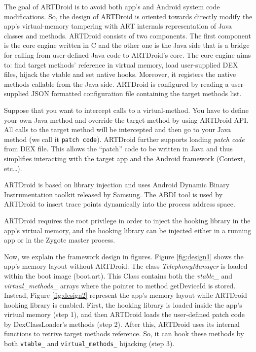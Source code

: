 The goal of ARTDroid is to avoid both app's and Android system code modifications. So, the design of ARTDroid is oriented towards directly modify the app's virtual-memory tampering with ART internals representation of Java classes and methods.
ARTDroid consists of two components. The first component is the core engine written in C and the other one is the Java side that is a bridge for calling from user-defined Java code to ARTDroid's core. The core engine aims to: find target methods' reference in virtual memory, load user-supplied DEX files, hijack the vtable and set native hooks. Moreover, it registers the native methods callable from the Java side. ARTDroid is configured by reading a user-supplied JSON formatted configuration file containing the target methods list.


Suppose that you want to intercept calls to a virtual-method. You have to define your own Java method and override the target method by using ARTDroid API. All calls to the target method will be intercepted and then go to your Java method (we call it {\tt patch code}). ARTDroid further supports loading \textit{patch code} from DEX file. This allows the “patch” code to be written in Java and thus simplifies interacting with the target app and the Android framework (Context, etc…). 

ARTDroid is based on library injection and uses Android Dynamic Binary Instrumentation toolkit\cite{ADBI} released by Samsung. The ABDI tool is used by ARTDroid to insert trace points dynamically into the process address space. 


ARTDroid requires the root privilege in order to inject the hooking library in the app's virtual memory, and the hooking library can be injected either in a running app or in the Zygote\cite{lee2014zygote} master process.

Now, we explain the framework design in figures. Figure \ref{fig:design1} shows the app's memory layout without ARTDroid. The class \textit{TelephonyManager} is loaded within the boot image (boot.art). This Class contains both the \textit{vtable\_} and \textit{virtual\_methods\_} arrays where the pointer to method getDeviceId is stored. Instead, Figure \ref{fig:design2} represent the app's memory layout while ARTDroid hooking library is enabled. First, the hooking library is loaded inside the app's virtual memory (step 1), and then ARTDroid loads the user-defined patch code by DexClassLoader's methods (step 2). After this, ARTDroid uses its internal functions to retrive target methods reference. So, it can hook these methods by both {\tt vtable\_} and {\tt virtual\_methods\_} hijacking (step 3). \\


